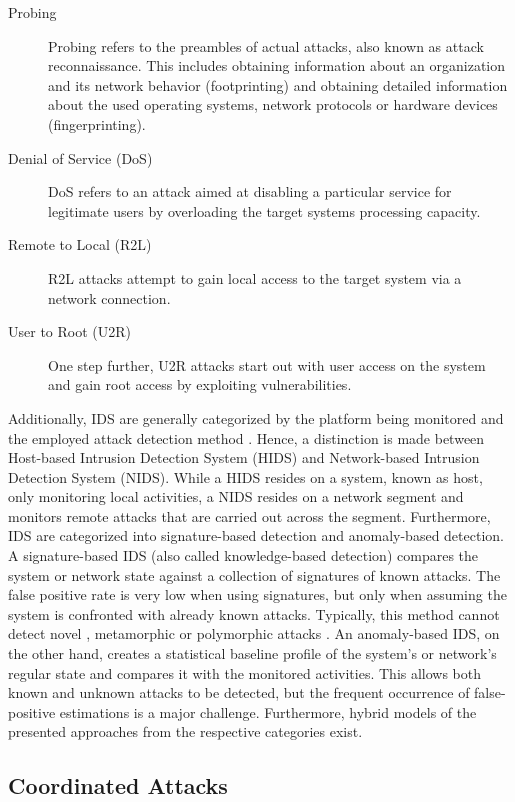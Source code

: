 \begin{description}
    \item[Probing] Probing refers to the preambles of actual attacks, also known as attack reconnaissance. This includes obtaining information about an organization and its network behavior (footprinting) and obtaining detailed information about the used operating systems, network protocols or hardware devices (fingerprinting).
    \item[Denial of Service (DoS)] DoS refers to an attack aimed at disabling a particular service for legitimate users by overloading the target systems processing capacity.
    \item[Remote to Local (R2L)] R2L attacks attempt to gain local access to the target system via a network connection.
    \item[User to Root (U2R)] One step further, U2R attacks start out with user access on the system and gain root access by exploiting vulnerabilities.
\end{description}

Additionally, IDS are generally categorized by the platform being monitored and the employed attack detection method \cite{milenkoski2015evaluating}. Hence, a distinction is made between Host-based Intrusion Detection System (HIDS) and Network-based Intrusion Detection System (NIDS). While a HIDS resides on a system, known as host, only monitoring local activities, a NIDS resides on a network segment and monitors remote attacks that are carried out across the segment. Furthermore, IDS are categorized into signature-based detection and anomaly-based detection. A signature-based IDS (also called knowledge-based detection) compares the system or network state against a collection of signatures of known attacks. The false positive rate is very low when using signatures, but only when assuming the system is confronted with already known attacks. Typically, this method cannot detect novel \cite[403]{whitman_principles_2018}, metamorphic or polymorphic attacks \cite[236]{szor2005art}. An anomaly-based IDS, on the other hand, creates a statistical baseline profile of the system’s or network’s regular state and compares it with the monitored activities. This allows both known and unknown attacks to be detected, but the frequent occurrence of false-positive estimations is a major challenge. Furthermore, hybrid models of the presented approaches from the respective categories exist.

\subsection{Coordinated Attacks}

